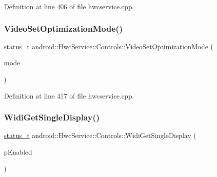 Definition at line 406 of file hwcservice.\+cpp.


\begin{DoxyCode}{0}
\end{DoxyCode}
\mbox{\label{classandroid_1_1HwcService_1_1Controls_a288b633b5e5e29d4778bcc4bff7e346b}} 
\subsubsection{\texorpdfstring{Video\+Set\+Optimization\+Mode()}{VideoSetOptimizationMode()}}
{\footnotesize\ttfamily \mbox{\hyperlink{hwcserviceapi_8h_a3806fb2027d9a316d8ca8d9b8b8eb96f}{status\+\_\+t}} android\+::\+Hwc\+Service\+::\+Controls\+::\+Video\+Set\+Optimization\+Mode (\begin{DoxyParamCaption}\item[{\mbox{\hyperlink{hwcserviceapi_8h_a73044de23b8f474352d6753e21fca06d}{E\+Hwcs\+Optimization\+Mode}}}]{mode }\end{DoxyParamCaption})}



Definition at line 417 of file hwcservice.\+cpp.


\begin{DoxyCode}{0}
\end{DoxyCode}
\mbox{\label{classandroid_1_1HwcService_1_1Controls_a1fa6ed897de094545383b2e865753834}} 
\subsubsection{\texorpdfstring{Widi\+Get\+Single\+Display()}{WidiGetSingleDisplay()}}
{\footnotesize\ttfamily \mbox{\hyperlink{hwcserviceapi_8h_a3806fb2027d9a316d8ca8d9b8b8eb96f}{status\+\_\+t}} android\+::\+Hwc\+Service\+::\+Controls\+::\+Widi\+Get\+Single\+Display (\begin{DoxyParamCaption}\item[{bool $\ast$}]{p\+Enabled }\end{DoxyParamCaption})}



